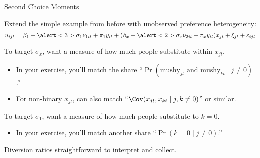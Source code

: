\documentclass[aspectratio=169,t,11pt,table]{beamer}
\begin{document}
\begin{frame}{Second Choice Moments}
    \begin{wideitemize}
        \item Extend the simple example from before with unobserved preference heterogeneity:
        \begin{equation*}
            u_{ijt} = \beta_1 + \alert<3>{\sigma_1} \nu_{1it} + \pi_1 y_{it} + (\beta_x + \alert<2>{\sigma_x} \nu_{2it} + \pi_x y_{it}) x_{jt} + \xi_{jt} + \varepsilon_{ijt} 
        \end{equation*}
        \vspace{-1.5\baselineskip}
        \pause
        \item To target \alert<2>{$\sigma_x$}, want a measure of how much people substitute within $x_{jt}$.
        \begin{itemize}
            \item In your exercise, you'll match the share ``$\Pr(\text{mushy}_{jt} \text{ and } \text{mushy}_{kt} \mid j \neq 0)$.''
            \item For non-binary $x_{jt}$, can also match ``$\Cov(x_{jt}, x_{kt} \mid j, k \neq 0)$'' or similar.
        \end{itemize}
        \pause
        \item To target \alert<3>{$\sigma_1$}, want a measure of how much people substitute to $k = 0$.
        \begin{itemize}
            \item In your exercise, you'll match another share ``$\Pr(k = 0 \mid j \neq 0)$.''
        \end{itemize}
        \pause
        \item \alert{Diversion ratios} straightforward to interpret and collect.
    \end{wideitemize}
\end{frame}
\end{document}

